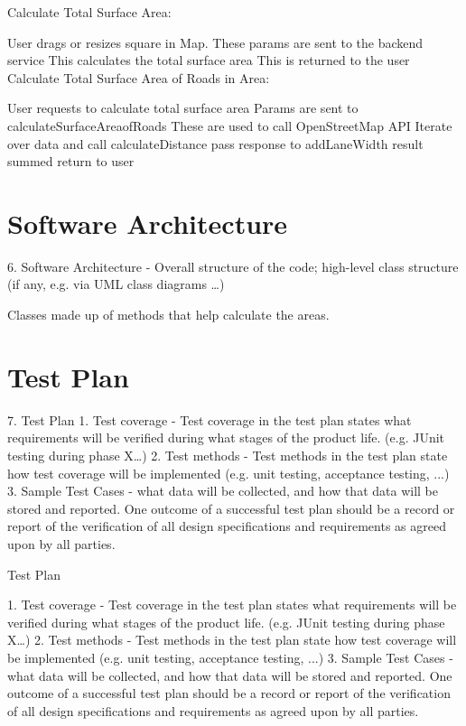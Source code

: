 \documentclass[a4paper,11pt]{article}
\begin{document}

Calculate Total Surface Area:

User drags or resizes square in Map.
These params are sent to the backend service
This calculates the total surface area
This is returned to the user
Calculate Total Surface Area of Roads in Area:

User requests to calculate total surface area
Params are sent to calculateSurfaceAreaofRoads
These are used to call OpenStreetMap API
Iterate over data and call calculateDistance
pass response to addLaneWidth
result summed
return to user


\section{Software Architecture}

6. Software Architecture - Overall structure of the code; high-level class structure (if any, e.g. via UML class diagrams …)



Classes made up of methods that help calculate the areas.

\section{Test Plan}

7. Test Plan
  1. Test coverage - Test coverage in the test plan states what requirements will be verified during what stages of the product life. (e.g. JUnit testing during phase X…)
  2. Test methods - Test methods in the test plan state how test coverage will be implemented (e.g. unit testing, acceptance testing, ...)
  3. Sample Test Cases - what data will be collected, and how that data will be stored and reported. One outcome of a successful test plan should be a record or report of the verification of all design specifications and requirements as agreed upon by all parties.


Test Plan

1. Test coverage - Test coverage in the test plan states what requirements will be verified during what stages of the product life. (e.g. JUnit testing during phase X…)
2. Test methods - Test methods in the test plan state how test coverage will be implemented (e.g. unit testing, acceptance testing, ...)
3. Sample Test Cases - what data will be collected, and how that data will be stored and reported. One outcome of a successful test plan should be a record or report of the verification of all design specifications and requirements as agreed upon by all parties.
\end{document}
